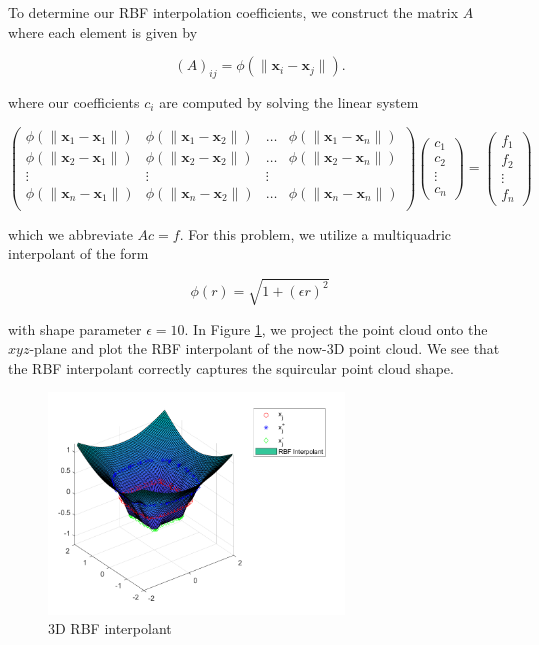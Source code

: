 \begin{solution}
  \pagebreak
  To determine our RBF interpolation coefficients, we construct the matrix $A$ where each element is given by

  $$
  (A)_{ij} = \phi \left( \lVert \bm{x}_i - \bm{x}_j \rVert \right).
  $$

  where our coefficients $c_i$ are computed by solving the linear system

  $$
  \begin{pmatrix}
    \phi (\lVert \bm{x}_1 - \bm{x}_1 \lVert) & \phi(\lVert \bm{x}_1 - \bm{x}_2 \lVert) & \dots & \phi(\lVert \bm{x}_1 - \bm{x}_n \lVert) \\
    \phi (\lVert \bm{x}_2 - \bm{x}_1 \lVert) & \phi(\lVert \bm{x}_2 - \bm{x}_2 \lVert) & \dots & \phi(\lVert \bm{x}_2 - \bm{x}_n \lVert) \\
    \vdots                                   & \vdots                                  & \vdots                                          \\
    \phi (\lVert \bm{x}_n - \bm{x}_1 \lVert) & \phi(\lVert \bm{x}_n - \bm{x}_2 \lVert) & \dots & \phi(\lVert \bm{x}_n - \bm{x}_n \lVert) \\
  \end{pmatrix} \begin{pmatrix}
    c_1 \\
    c_2 \\
    \vdots \\
    c_n
  \end{pmatrix} = \begin{pmatrix}
    f_1 \\
    f_2 \\
    \vdots \\
    f_n
  \end{pmatrix}
  $$

  which we abbreviate $A c = f$. For this problem, we utilize a multiquadric interpolant of the form

  $$
  \phi(r) = \sqrt{1 + (\epsilon r)^2}
  $$

  with shape parameter $\epsilon = 10$. In Figure \ref{fig:problem_1ii}, we project the point cloud onto the $xyz$-plane 
  and plot the RBF interpolant  of the now-3D point cloud. We see that the RBF interpolant correctly captures the squircular point cloud shape.

  \begin{figure}[h]
    \centering
    \includegraphics*[width=0.7\textwidth]{problem_1ii.png}
    \caption{3D RBF interpolant}
    \label{fig:problem_1ii}
  \end{figure}


\end{solution}
